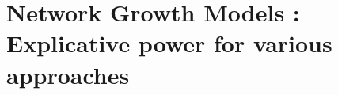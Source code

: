 



\section[Network Growth Models]{Network Growth Models : Explicative power for various approaches}














